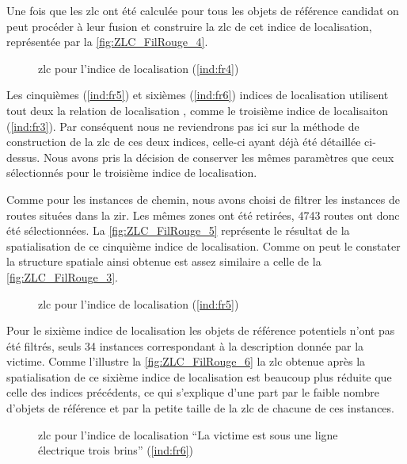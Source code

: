 Une fois que les \ac{zlc} ont été calculée pour tous les objets de
référence candidat on peut procéder à leur fusion et construire la
\ac{zlc} de cet indice de localisation, représentée par la
\autoref{fig:ZLC_FilRouge_4}.

\begin{figure}
  \centering
  
  \caption{\ac{zlc} pour l'indice de localisation  (\ref{ind:fr4})}
  \label{fig:ZLC_FilRouge_4}
\end{figure}

Les cinquièmes (\ref{ind:fr5}) et sixièmes (\ref{ind:fr6}) indices de
localisation utilisent tout deux la relation de localisation
, comme le troisième indice de
localisaiton (\ref{ind:fr3}). Par conséquent nous ne reviendrons pas
ici sur la méthode de construction de la \ac{zlc} de ces deux indices,
celle-ci ayant déjà été détaillée ci-dessus. Nous avons pris la
décision de conserver les mêmes paramètres que ceux sélectionnés pour
le troisième indice de localisation.

Comme pour les instances de chemin, nous avons choisi de filtrer les
instances de routes situées dans la \ac{zir}. Les mêmes zones ont été
retirées, \num{4743} routes ont donc été sélectionnées.
%
La \autoref{fig:ZLC_FilRouge_5} représente le résultat de la
spatialisation de ce cinquième indice de localisation. Comme on peut
le constater la structure spatiale ainsi obtenue est assez similaire a
celle de la \autoref{fig:ZLC_FilRouge_3}.

\begin{figure}
  \centering
  
  \caption{\ac{zlc} pour l'indice de localisation  (\ref{ind:fr5})}
  \label{fig:ZLC_FilRouge_5}
\end{figure}

Pour le sixième indice de localisation les objets de référence
potentiels n'ont pas été filtrés, seuls 34 instances correspondant à
la description donnée par la victime.
%
Comme l'illustre la \autoref{fig:ZLC_FilRouge_6} la \ac{zlc} obtenue après
la spatialisation de ce sixième indice de localisation est beaucoup
plus réduite que celle des indices précédents, ce qui s'explique d'une
part par le faible nombre d'objets de référence et par la petite
taille de la \ac{zlc} de chacune de ces instances.

\begin{figure}
  \centering
  
  \caption{\ac{zlc} pour l'indice de localisation \enquote{La victime
      est sous une ligne électrique trois brins} (\ref{ind:fr6})}
  \label{fig:ZLC_FilRouge_6}
\end{figure}


